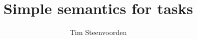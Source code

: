 \documentclass
  [a4paper
  ,justified
  ,nofonts
  ]{tufte-handout}
\begin{document}
\title{Simple semantics for tasks}
\author{Tim Steenvoorden}

\maketitle


\tableofcontents
\newpage











\end{document}
